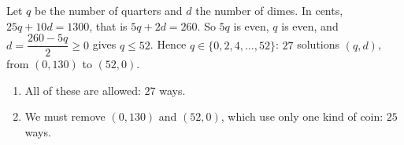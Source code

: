 Let $q$ be the number of quarters and $d$ the number of dimes. In cents, $25q+10d=1300$, that is $5q+2d=260$. So $5q$ is even, $q$ is even, and $d=\dfrac{260-5q}{2}\ge0$ gives $q\le52$. Hence $q\in\{0,2,4,\dots,52\}$: $27$ solutions $(q,d)$, from $(0,130)$ to $(52,0)$.
\begin{enumerate}
\item[(b)] All of these are allowed: $\boxed{27}$ ways.
\item[(a)] We must remove $(0,130)$ and $(52,0)$, which use only one kind of coin: $\boxed{25}$ ways.
\end{enumerate}
